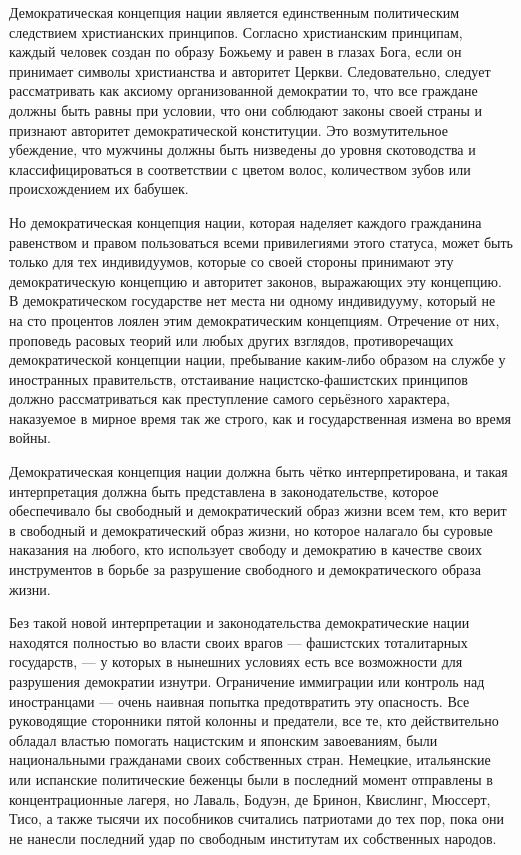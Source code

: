 Демократическая концепция нации является единственным политическим следствием христианских принципов. Согласно христианским принципам, каждый человек создан по образу Божьему и равен в глазах Бога, если он принимает символы христианства и авторитет Церкви. Следовательно, следует рассматривать как аксиому организованной демократии то, что все граждане должны быть равны при условии, что они соблюдают законы своей страны и признают авторитет демократической конституции. Это возмутительное убеждение, что мужчины должны быть низведены до уровня скотоводства и классифицироваться в соответствии с цветом волос, количеством зубов или происхождением их бабушек.

Но демократическая концепция нации, которая наделяет каждого гражданина равенством и правом пользоваться всеми привилегиями этого статуса, может быть только для тех индивидуумов, которые со своей стороны принимают эту демократическую концепцию и авторитет законов, выражающих эту концепцию. В демократическом государстве нет места ни одному индивидууму, который не на сто процентов лоялен этим демократическим концепциям. Отречение от них, проповедь расовых теорий или любых других взглядов, противоречащих демократической концепции нации, пребывание каким-либо образом на службе у иностранных правительств, отстаивание нацистско-фашистских принципов должно рассматриваться как преступление самого серьёзного характера, наказуемое в мирное время так же строго, как и государственная измена во время войны.

Демократическая концепция нации должна быть чётко интерпретирована, и такая интерпретация должна быть представлена в законодательстве, которое обеспечивало бы свободный и демократический образ жизни всем тем, кто верит в свободный и демократический образ жизни, но которое налагало бы суровые наказания на любого, кто использует свободу и демократию в качестве своих инструментов в борьбе за разрушение свободного и демократического образа жизни.

Без такой новой интерпретации и законодательства демократические нации находятся полностью во власти своих врагов — фашистских тоталитарных государств, — у которых в нынешних условиях есть все возможности для разрушения демократии изнутри. Ограничение иммиграции или контроль над иностранцами — очень наивная попытка предотвратить эту опасность. Все руководящие сторонники пятой колонны и предатели, все те, кто действительно обладал властью помогать нацистским и японским завоеваниям, были национальными гражданами своих собственных стран. Немецкие, итальянские или испанские политические беженцы были в последний момент отправлены в концентрационные лагеря, но Лаваль, Бодуэн, де Бринон, Квислинг, Мюссерт, Тисо, а также тысячи их пособников считались патриотами до тех пор, пока они не нанесли последний удар по свободным институтам их собственных народов.


